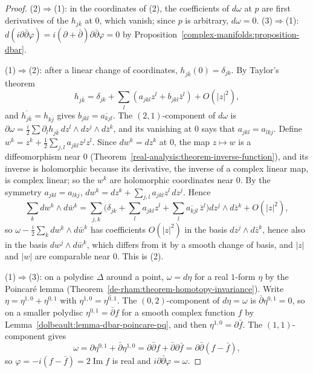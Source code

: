 \begin{proof}
(2)$\Rightarrow$(1): in the coordinates of (2), the coefficients of $d\omega$ at $p$ are first derivatives of the $h_{j\bar k}$ at $0$, which
vanish; since $p$ is arbitrary, $d\omega = 0$. (3)$\Rightarrow$(1): $d(i\partial\bar\partial\varphi) = i(\partial + \bar\partial)\partial\bar\partial\varphi = 0$ by
Proposition~\ref{complex-manifolds:proposition-dbar}.

(1)$\Rightarrow$(2): after a linear change of coordinates, $h_{j\bar k}(0) = \delta_{jk}$. By Taylor's theorem
\[
h_{j\bar k} = \delta_{jk} + \sum_l\left(a_{jkl}z^l + b_{jkl}\bar z^l\right) + O(|z|^2),
\]
and $\overline{h_{j\bar k}} = h_{k\bar j}$ gives $b_{jkl} = \overline{a_{kjl}}$. The $(2,1)$-component of $d\omega$ is
$\partial\omega = \frac{i}{2}\sum\partial_lh_{j\bar k}\,dz^l \wedge dz^j \wedge d\bar z^k$, and its vanishing at $0$ says that
$a_{jkl} = a_{lkj}$. Define $w^k = z^k + \frac12\sum_{j,l}a_{jkl}z^jz^l$. Since $dw^k = dz^k$ at $0$, the map $z \mapsto w$ is a diffeomorphism near $0$
(Theorem~\ref{real-analysis:theorem-inverse-function}), and its inverse is holomorphic because its derivative, the inverse of a complex
linear map, is complex linear; so the $w^k$ are holomorphic coordinates near $0$. By the symmetry $a_{jkl} = a_{lkj}$,
$dw^k = dz^k + \sum_{j,l}a_{jkl}z^l\,dz^j$. Hence
\[
\sum_kdw^k \wedge d\bar w^k = \sum_{j,k}\Big(\delta_{jk} + \sum_la_{jkl}z^l + \sum_l\overline{a_{kjl}}\,\bar z^l\Big)dz^j \wedge d\bar z^k + O(|z|^2),
\]
so $\omega - \frac{i}{2}\sum_kdw^k \wedge d\bar w^k$ has coefficients $O(|z|^2)$ in the basis $dz^j \wedge d\bar z^k$, hence also in the
basis $dw^j \wedge d\bar w^k$, which differs from it by a smooth change of basis, and $|z|$ and $|w|$ are comparable near $0$. This is (2).

(1)$\Rightarrow$(3): on a polydisc $\Delta$ around a point, $\omega = d\eta$ for a real $1$-form $\eta$ by the Poincar\'e lemma
(Theorem~\ref{de-rham:theorem-homotopy-invariance}). Write $\eta = \eta^{1,0} + \eta^{0,1}$ with $\eta^{1,0} = \overline{\eta^{0,1}}$.
The $(0,2)$-component of $d\eta = \omega$ is $\bar\partial\eta^{0,1} = 0$, so on a smaller polydisc $\eta^{0,1} = \bar\partial f$ for a
smooth complex function $f$ by Lemma~\ref{dolbeault:lemma-dbar-poincare-pq}, and then $\eta^{1,0} = \partial\bar f$. The $(1,1)$-component
gives
\[
\omega = \partial\eta^{0,1} + \bar\partial\eta^{1,0} = \partial\bar\partial f + \bar\partial\partial\bar f = \partial\bar\partial(f - \bar f),
\]
so $\varphi = -i(f - \bar f) = 2\operatorname{Im}f$ is real and $i\partial\bar\partial\varphi = \omega$.
\end{proof}

